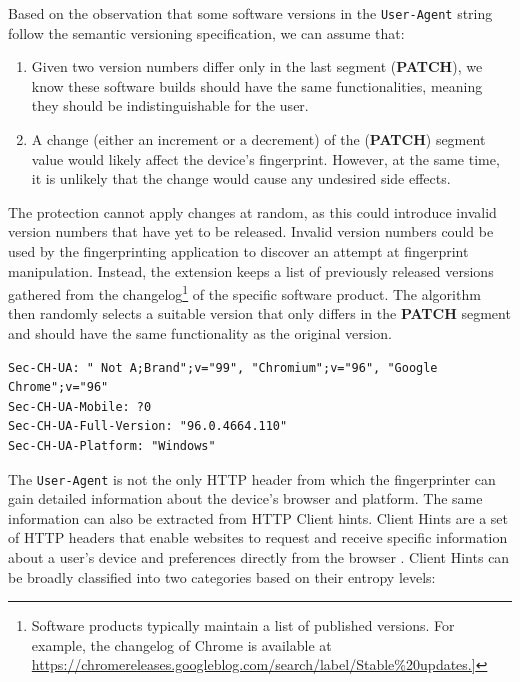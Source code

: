 Based on the observation that some software versions in the \texttt{User-Agent} string follow the semantic versioning specification, we can assume that:

\begin{enumerate}
	\item Given two version numbers differ only in the last segment (\textbf{PATCH}), we know these software builds should have the same functionalities, meaning they should be indistinguishable for the user.
	\item A change (either an increment or a decrement) of the (\textbf{PATCH}) segment value would likely affect the device's fingerprint. However, at the same time, it is unlikely that the change would cause any undesired side effects.
\end{enumerate}

The protection cannot apply changes at random, as this could introduce invalid version numbers that have yet to be released. Invalid version numbers could be used by the fingerprinting application to discover an attempt at fingerprint manipulation. Instead, the extension keeps a list of previously released versions gathered from the changelog\footnote{Software products typically maintain a list of published versions. For example, the changelog of Chrome is available at \url{https://chromereleases.googleblog.com/search/label/Stable\%20updates.]}} of the specific software product. The algorithm then randomly selects a suitable version that only differs in the \textbf{PATCH} segment and should have the same functionality as the original version.

\bigbreak

\begin{lstlisting}[caption={An example of HTTP Client hints \cite{MDN}.}, label={Listing:HTTPClientHintsExample}]
Sec-CH-UA: " Not A;Brand";v="99", "Chromium";v="96", "Google Chrome";v="96"
Sec-CH-UA-Mobile: ?0
Sec-CH-UA-Full-Version: "96.0.4664.110"
Sec-CH-UA-Platform: "Windows"
\end{lstlisting}

\medbreak

The \texttt{User-Agent} is not the only HTTP header from which the fingerprinter can gain detailed information about the device's browser and platform. The same information can also be extracted from HTTP Client hints. Client Hints are a set of HTTP headers that enable websites to request and receive specific information about a user's device and preferences directly from the browser \cite{MDN}. Client Hints can be broadly classified into two categories based on their entropy levels:

